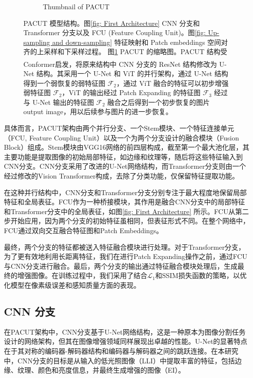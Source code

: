 \documentclass[a4paper]{ctexart}
\newcommand{\upcite}[1]{\rmfamily\textsuperscript{\textsuperscript{\cite{#1}}}}
\begin{document}
\begin{figure}[htb]
\begin{subfigure}{0.4\textwidth}
		\captionsetup{font=scriptsize}
		\caption{Thumbnail of PACUT}
		\label{fig: The proposed initial architecture(Abstract Picture)}	
	\end{subfigure}
	\caption{
		\label{fig: PACUT}
		PACUT 模型结构。图\ref{fig: First Architecture} CNN 分支和 Transformer 分支以及 FCU (Feature Coupling Unit)。图\ref{fig: Up-sampling and down-sampling} 特征映射和 Patch embeddings 空间对齐的上采样和下采样过程。 图\ref{fig: The proposed initial architecture(Abstract Picture)} PACUT 的缩略图。PACUT 结构受 Conformer\upcite{peng2021conformer}启发，将原来结构中 CNN 分支的 ResNet 结构修改为 U-Net 结构。其采用一个 U-Net 和 ViT 的并行架构，通过 U-Net 结构得到一个弱恢复的弱特征图 $\mathcal{F}_2$，通过 ViT 融合的特征可以初步增强弱特征图 $\mathcal{F}_2$，ViT 的输出经过 Patch Expanding 的特征图 $\mathcal{F}_3$ 经过与 U-Net 输出的特征图 $\mathcal{F}_2$ 融合之后得到一个初步恢复的图片 output image，用以后续参与图片的进一步恢复。
	}
\end{figure}

具体而言，PACUT架构由两个并行分支、一个Stem模块、一个特征连接单元（FCU, Feature Coupling Unit）以及一个为两个分支设计的融合模块（Fusion Block）组成。Stem模块由VGG16网络的前四层构成，截至第一个最大池化层，其主要功能是提取图像的初始局部特征，如边缘和纹理等，随后将这些特征输入到CNN分支。CNN分支采用了改进的U-Net网络结构，而Transformer分支则由一个经过修改的Vision Transformer构成，去除了分类功能，仅保留特征提取功能。

在这种并行结构中，CNN分支和Transformer分支分别专注于最大程度地保留局部特征和全局表征。FCU作为一种桥接模块，其作用是融合CNN分支中的局部特征和Transformer分支中的全局表征，如图\ref{fig: First Architecture} 所示。FCU从第二步开始应用，因为两个分支的初始特征虽相同，但表征形式不同。在整个网络中，FCU通过双向交互融合特征图和Patch Embeddings。

最终，两个分支的特征都被送入特征融合模块进行处理。对于Transformer分支，为了更有效地利用长距离特征，我们在进行Patch Expanding操作之前，通过FCU与CNN分支进行融合。最后，两个分支的输出通过特征融合模块处理后，生成最终的增强图像。在训练过程中，我们采用了结合$\mathcal{L}_1$和SSIM损失函数的策略，以优化模型在像素级误差和感知质量方面的表现。

\subsection{CNN 分支}

在PACUT架构中，CNN分支基于U-Net网络结构，这是一种原本为图像分割任务设计的网络架构，但其在图像增强领域同样展现出卓越的性能。U-Net的显著特点在于其对称的编码器-解码器结构和编码器与解码器之间的跳跃连接。在本研究中，CNN分支的目标是从输入的低光照图像（LLI）中提取丰富的特征，包括边缘、纹理、颜色和亮度信息，并最终生成增强的图像（EI）。
\end{document}
